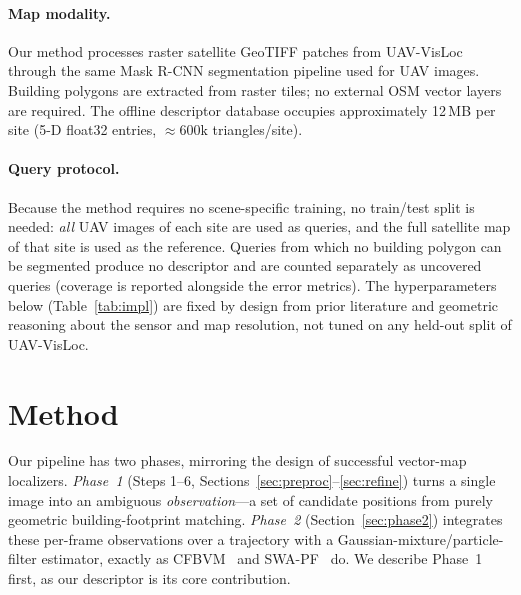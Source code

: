 \documentclass[10pt]{article}
\theoremstyle{plain}
\theoremstyle{definition}
\begin{document}
\paragraph{Map modality.}
Our method processes raster satellite GeoTIFF patches from UAV-VisLoc through
the same Mask R-CNN segmentation pipeline used for UAV images.
Building polygons are extracted from raster tiles; no external OSM vector
layers are required.
The offline descriptor database occupies approximately 12\,MB per site
(5-D float32 entries, ${\approx}600\text{k}$ triangles/site).

\paragraph{Query protocol.}
Because the method requires no scene-specific training, no train/test split is
needed: \emph{all} UAV images of each site are used as queries, and the full
satellite map of that site is used as the reference.
Queries from which no building polygon can be segmented produce no descriptor
and are counted separately as uncovered queries (coverage is reported alongside
the error metrics).
The hyperparameters below (Table~\ref{tab:impl}) are fixed by design from
prior literature and geometric reasoning about the sensor and map resolution,
not tuned on any held-out split of UAV-VisLoc.

\section{Method}
\label{sec:method}

Our pipeline has two phases, mirroring the design of successful vector-map
localizers. \emph{Phase~1} (Steps 1--6, Sections~\ref{sec:preproc}--\ref{sec:refine})
turns a single image into an ambiguous \emph{observation}---a set of candidate
positions from purely geometric building-footprint matching. \emph{Phase~2}
(Section~\ref{sec:phase2}) integrates these per-frame observations over a
trajectory with a Gaussian-mixture/particle-filter estimator, exactly as
CFBVM~\cite{ouyang2024cfbvm} and SWA-PF~\cite{yuan2025swapf} do. We describe
Phase~1 first, as our descriptor is its core contribution.
\end{document}
